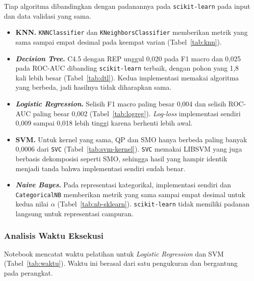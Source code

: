 Tiap algoritma dibandingkan dengan padanannya pada \texttt{scikit-learn} pada
input dan data validasi yang sama.

\begin{itemize}
    \item \textbf{KNN.} \texttt{KNNClassifier} dan
        \texttt{KNeighborsClassifier} memberikan metrik yang sama sampai empat
        desimal pada keempat varian (Tabel~\ref{tab:knn}).
    \item \textbf{\textit{Decision Tree}.} C4.5 dengan REP unggul 0,020 pada
        F1 macro dan 0,025 pada ROC-AUC dibanding \texttt{scikit-learn}
        terbaik, dengan pohon yang 1,8 kali lebih besar (Tabel~\ref{tab:dtl}).
        Kedua implementasi memakai algoritma yang berbeda, jadi hasilnya tidak
        diharapkan sama.
    \item \textbf{\textit{Logistic Regression}.} Selisih F1 macro paling besar
        0,004 dan selisih ROC-AUC paling besar 0,002 (Tabel~\ref{tab:logreg}).
        \textit{Log-loss} implementasi sendiri 0,009 sampai 0,018 lebih tinggi
        karena berhenti lebih awal.
    \item \textbf{SVM.} Untuk kernel yang sama, QP dan SMO hanya berbeda paling
        banyak 0,0006 dari \texttt{SVC} (Tabel~\ref{tab:svm-kernel}).
        \texttt{SVC} memakai LIBSVM yang juga berbasis dekomposisi seperti SMO,
        sehingga hasil yang hampir identik menjadi tanda bahwa implementasi
        sendiri sudah benar.
    \item \textbf{\textit{Naive Bayes}.} Pada representasi kategorikal,
        implementasi sendiri dan \texttt{CategoricalNB} memberikan metrik yang
        sama sampai empat desimal untuk kedua nilai $\alpha$
        (Tabel~\ref{tab:nb-sklearn}). \texttt{scikit-learn} tidak memiliki
        padanan langsung untuk representasi campuran.
\end{itemize}

\subsubsection{Analisis Waktu Eksekusi}

Notebook mencatat waktu pelatihan untuk \textit{Logistic Regression} dan
SVM (Tabel~\ref{tab:waktu}). Waktu ini berasal dari satu pengukuran dan
bergantung pada perangkat.

